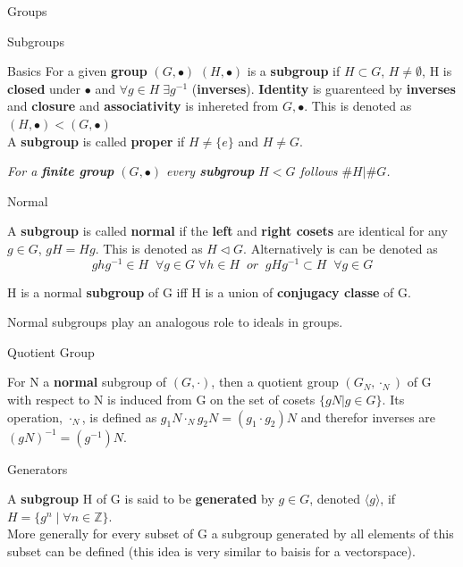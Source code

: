 \documentclass[12pt, letterpaper]{article}
\begin{document}
\begin{section}{Groups}
\begin{subsection}{Subgroups}
\begin{subsubsection}{Basics}
      For a given \textbf{group} \((G, \bullet)\) \((H, \bullet)\) is a \textbf{subgroup}
      if \(H \subset G\), \(H \neq \emptyset\), H is \textbf{closed} under \(\bullet\)
      and \(\forall g \in H \; \exists g^{-1}\) (\textbf{inverses}). \textbf{Identity}
      is guarenteed by \textbf{inverses} and \textbf{closure} and \textbf{associativity}
      is inhereted from \(G, \bullet\). This is denoted as \((H, \bullet) < (G, \bullet)\) \\
      A \textbf{subgroup} is called \textbf{proper} if \(H \neq \{{} e \}{}\) and
      \(H \neq G\).

      \emph{For a \textbf{finite group} \((G, \bullet)\) every \textbf{subgroup}
        \(H < G\) follows \(\#H|\#G\).}

    \end{subsubsection}

    \begin{subsubsection}{Normal}

      A \textbf{subgroup} is called \textbf{normal} if the \textbf{left} and
      \textbf{right cosets} are identical for any \(g \in G\), \(gH = Hg\).
      This is denoted as \(H \triangleleft G\). Alternatively is can be denoted as
      \[ghg^{-1} \in H \;\; \forall g \in G \; \forall h \in H \;\;
        or \;\; gHg^{-1} \subset H \;\; \forall g \in G\]

      H is a normal \textbf{subgroup} of G iff H is a union of \textbf{conjugacy classe}
      of G.

      Normal subgroups play an analogous role to ideals in groups.

    \end{subsubsection}

    \begin{subsubsection}{Quotient Group}

      For N a \textbf{normal} subgroup of \((G, \cdot)\), then a quotient group
      \((G_{N}, \cdot_{N})\) of G with respect to N is induced from G on the set
      of cosets \(\{ gN | g \in G \}\). Its operation, \(\cdot_{N}\), is defined as
      \(g_{1}N \cdot_{N} g_{2}N = (g_{1} \cdot g_{2})N\) and therefor inverses are
      \((gN)^{-1} = (g^{-1})N\).

    \end{subsubsection}

    \begin{subsubsection}{Generators}

      A \textbf{subgroup} H of G is said to be \textbf{generated} by \(g \in G\),
      denoted \(\langle g \rangle\), if \(H = \{ g^{n} \; | \; \forall n \in \mathbb{Z} \}\). \\
      More generally for every subset of G a subgroup generated by all elements
      of this subset can be defined (this idea is very similar to baisis for a
      vectorspace).


\end{subsubsection}
\end{subsection}
\end{section}
\end{document}
